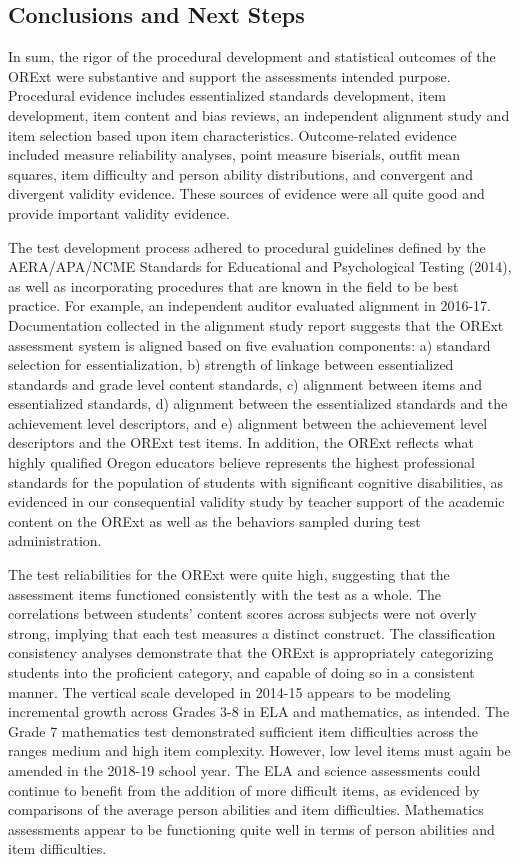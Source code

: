 \documentclass[]{article}
\begin{document}
\subsection{Conclusions and Next
Steps}\label{conclusions-and-next-steps}

In sum, the rigor of the procedural development and statistical outcomes
of the ORExt were substantive and support the assessments intended
purpose. Procedural evidence includes essentialized standards
development, item development, item content and bias reviews, an
independent alignment study and item selection based upon item
characteristics. Outcome-related evidence included measure reliability
analyses, point measure biserials, outfit mean squares, item difficulty
and person ability distributions, and convergent and divergent validity
evidence. These sources of evidence were all quite good and provide
important validity evidence.

The test development process adhered to procedural guidelines defined by
the AERA/APA/NCME Standards for Educational and Psychological Testing
(2014), as well as incorporating procedures that are known in the field
to be best practice. For example, an independent auditor evaluated
alignment in 2016-17. Documentation collected in the alignment study
report suggests that the ORExt assessment system is aligned based on
five evaluation components: a) standard selection for essentialization,
b) strength of linkage between essentialized standards and grade level
content standards, c) alignment between items and essentialized
standards, d) alignment between the essentialized standards and the
achievement level descriptors, and e) alignment between the achievement
level descriptors and the ORExt test items. In addition, the ORExt
reflects what highly qualified Oregon educators believe represents the
highest professional standards for the population of students with
significant cognitive disabilities, as evidenced in our consequential
validity study by teacher support of the academic content on the ORExt
as well as the behaviors sampled during test administration.

The test reliabilities for the ORExt were quite high, suggesting that
the assessment items functioned consistently with the test as a whole.
The correlations between students' content scores across subjects were
not overly strong, implying that each test measures a distinct
construct. The classification consistency analyses demonstrate that the
ORExt is appropriately categorizing students into the proficient
category, and capable of doing so in a consistent manner. The vertical
scale developed in 2014-15 appears to be modeling incremental growth
across Grades 3-8 in ELA and mathematics, as intended. The Grade 7
mathematics test demonstrated sufficient item difficulties across the
ranges medium and high item complexity. However, low level items must
again be amended in the 2018-19 school year. The ELA and science
assessments could continue to benefit from the addition of more
difficult items, as evidenced by comparisons of the average person
abilities and item difficulties. Mathematics assessments appear to be
functioning quite well in terms of person abilities and item
difficulties.
\end{document}
